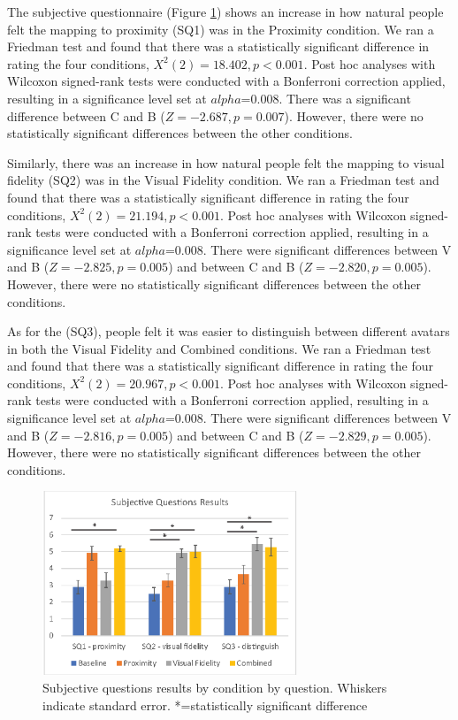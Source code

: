 The subjective questionnaire (Figure \ref{fig:contacts:sq2}) shows an increase in how natural people felt the mapping to proximity (SQ1) was in the Proximity condition. We ran a Friedman test and found that there was a statistically significant difference in rating the four conditions, $X^2(2)=18.402,p<0.001$. Post hoc analyses with Wilcoxon signed-rank tests were conducted with a Bonferroni correction applied, resulting in a significance level set at $alpha$=0.008. There was a significant difference between C and B ($Z=-2.687, p=0.007$). However, there were no statistically significant differences between the other conditions.

Similarly, there was an increase in how natural people felt the mapping to visual fidelity (SQ2) was in the Visual Fidelity condition. We ran a Friedman test and found that there was a statistically significant difference in rating the four conditions, $X^2(2)=21.194,p<0.001$. Post hoc analyses with Wilcoxon signed-rank tests were conducted with a Bonferroni correction applied, resulting in a significance level set at $alpha$=0.008. There were significant differences between V and B  ($Z=-2.825, p=0.005$) and between C and B ($Z=-2.820, p=0.005$). However, there were no statistically significant differences between the other conditions.

As for the (SQ3), people felt it was easier to distinguish between different avatars in both the Visual Fidelity and Combined conditions. We ran a Friedman test and found that there was a statistically significant difference in rating the four conditions, $X^2(2)=20.967,p<0.001$. Post hoc analyses with Wilcoxon signed-rank tests were conducted with a Bonferroni correction applied, resulting in a significance level set at $alpha$=0.008. There were significant differences between V and B  ($Z=-2.816, p=0.005$) and between C and B ($Z=-2.829, p=0.005$). However, there were no statistically significant differences between the other conditions.


\begin{figure}[ht]
	\centering
	\includegraphics[width=3in]{images/analysis-images-05.eps}
	\caption{Subjective questions results by condition by question. Whiskers indicate standard error. *=statistically significant difference}
	\label{fig:contacts:sq2}
\end{figure}

